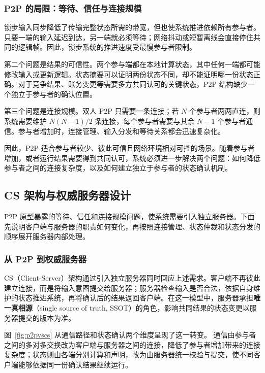 \subsubsection{P2P 的局限：等待、信任与连接规模}\label{sec2:p2p-limits}

锁步输入同步降低了传输完整状态所需的带宽，但也使系统推进依赖所有参与者。只要一端的输入延迟到达，另一端就必须等待；网络抖动或短暂离线会直接停住共同的逻辑帧。因此，锁步系统的推进速度受最慢参与者限制。

第二个问题是结果的可信性。两个参与端都在本地计算状态，其中任何一端都可能修改输入或更新逻辑。状态摘要可以证明两份状态不同，却不能证明哪一份状态正确。对于竞争结果、账务变更等需要多方共同认可的关键状态，P2P 结构缺少一个独立于参与者的确认位置。

第三个问题是连接规模。双人 P2P 只需要一条连接；若 $N$ 个参与者两两直连，则系统需要维护 $N(N-1)/2$ 条连接，每个参与者需要与其余 $N-1$ 个参与者通信。参与者增加时，连接管理、输入分发和等待关系都会迅速复杂化。

因此，P2P 适合参与者较少、彼此可信且网络环境相对可控的场景。随着参与者增加，或者运行结果需要得到共同认可，系统必须进一步解决两个问题：如何降低参与者之间的连接复杂度，以及如何建立独立于参与者的状态确认机制。

\subsection{CS 架构与权威服务器设计}\label{sec2:client-server}\label{sec2:server-modules}

P2P 原型暴露的等待、信任和连接规模问题，使系统需要引入独立服务器。下面先说明客户端与服务器的职责如何变化，再按照连接管理、状态仲裁和状态分发的顺序展开服务器内部处理。

\subsubsection{从 P2P 到权威服务器}

CS（Client-Server）架构通过引入独立服务器同时回应上述需求。客户端不再彼此建立连接，而是将输入意图提交给服务器；服务器检查输入是否合法，依据自身维护的状态推进系统，再将确认后的结果返回客户端。在这一模型中，服务器承担\textbf{唯一真相源}（single source of truth, SSOT）的角色，影响共同结果的状态变更以服务器提交的版本为准。

图~\ref{fig:p2pvscs} 从通信路径和状态确认两个维度呈现了这一转变。
通信由参与者之间的多对多交换改为客户端与服务器之间的连接，降低了参与者增加带来的连接复杂度；状态则由各端分别计算和声明，改为由服务器统一校验与提交，使不同客户端能够依据同一份确认结果继续运行。

